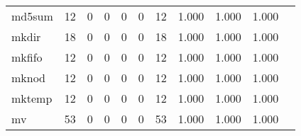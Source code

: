 \begin{longtable}{lp{1.2cm}p{1.2cm}p{1.2cm}p{1.2cm}p{1.2cm}p{1.2cm}p{1.2cm}p{1.2cm}p{1.2cm}p{1.2cm}}
md5sum    &                                    12 &                                                  0 &                                                  0 &                                                  0 &                                                  0 &                                                 12 &                                         1.000 &                                              1.000 &                                              1.000 \\
mkdir     &                                    18 &                                                  0 &                                                  0 &                                                  0 &                                                  0 &                                                 18 &                                         1.000 &                                              1.000 &                                              1.000 \\
mkfifo    &                                    12 &                                                  0 &                                                  0 &                                                  0 &                                                  0 &                                                 12 &                                         1.000 &                                              1.000 &                                              1.000 \\
mknod     &                                    12 &                                                  0 &                                                  0 &                                                  0 &                                                  0 &                                                 12 &                                         1.000 &                                              1.000 &                                              1.000 \\
mktemp    &                                    12 &                                                  0 &                                                  0 &                                                  0 &                                                  0 &                                                 12 &                                         1.000 &                                              1.000 &                                              1.000 \\
mv        &                                    53 &                                                  0 &                                                  0 &                                                  0 &                                                  0 &                                                 53 &                                         1.000 &                                              1.000 &                                              1.000 \\

\end{longtable}
